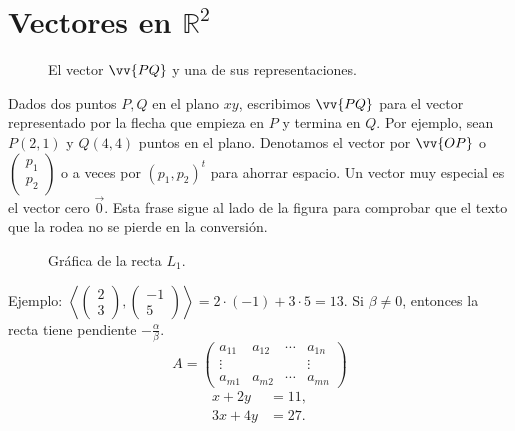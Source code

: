 \documentclass{article}
\begin{document}
\section{Vectores en $\mathbb{R}^2$}
\begin{figure}
\caption{El vector $\vv{PQ}$ y una de sus representaciones.}
\end{figure}
Dados dos puntos $P, Q$ en el plano $xy$, escribimos $\vv{PQ}$ para el vector representado por la flecha que empieza en $P$ y termina en $Q$. Por ejemplo, sean $P(2,1)$ y $Q(4,4)$ puntos en el plano. Denotamos el vector por $\vv{OP}$ o $\begin{pmatrix} p_1 \\ p_2 \end{pmatrix}$ o a veces por $(p_1,p_2)^t$ para ahorrar espacio. Un vector muy especial es el vector cero $\vec 0$. Esta frase sigue al lado de la figura para comprobar que el texto que la rodea no se pierde en la conversión.

\begin{figure}[h]
\centering
{}
\caption{Gráfica de la recta $L_1$.}
\end{figure}

Ejemplo: $\left\langle \begin{pmatrix} 2 \\ 3 \end{pmatrix}, \begin{pmatrix} -1 \\ 5 \end{pmatrix} \right\rangle = 2 \cdot (-1) + 3 \cdot 5 = 13$. Si $\beta \neq 0$, entonces la recta tiene pendiente $-\frac{\alpha}{\beta}$.
\[ A = \begin{pmatrix} a_{11} & a_{12} & \cdots & a_{1n} \\ \vdots & & & \vdots \\ a_{m1} & a_{m2} & \cdots & a_{mn} \end{pmatrix} \]
\begin{align*}
x + 2y &= 11, \\
3x + 4y &= 27.
\end{align*}
\end{document}

